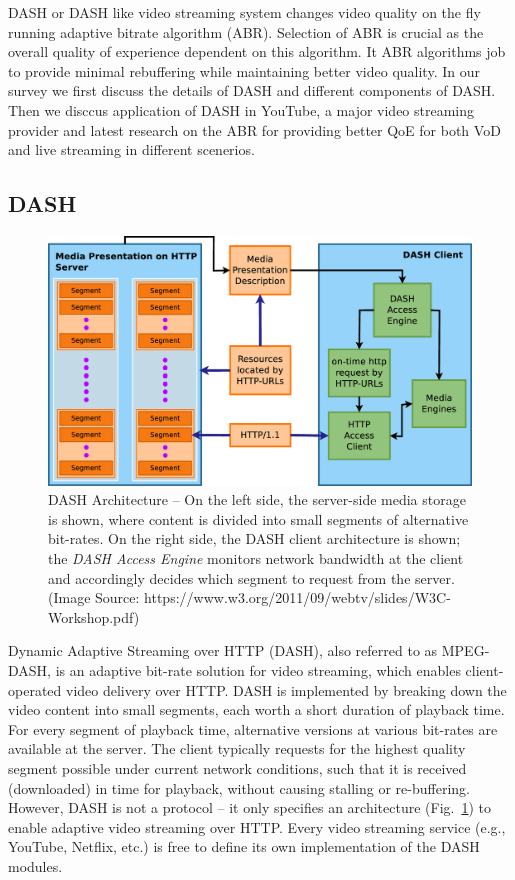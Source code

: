 DASH or DASH like video streaming system changes video quality on the fly running adaptive bitrate algorithm (ABR). Selection of ABR is crucial as the overall quality of experience dependent on this algorithm. It ABR algorithms job to provide minimal rebuffering while maintaining better video quality. In our survey we first discuss the details of DASH and different components of DASH. Then we disccus application of DASH in YouTube, a major video streaming provider and latest research on the ABR for providing better QoE for both VoD and live streaming in different scenerios.

\subsection{DASH}
\begin{figure}[!t]
	\centering
	\includegraphics[scale=0.15]{img/dash-arch}
	\caption{\small{DASH Architecture -- On the left side, the server-side media storage is shown, where content is divided into small segments of alternative bit-rates. On the right side, the DASH client architecture is shown; the {\it DASH Access Engine} monitors network bandwidth at the client and accordingly decides which segment to request from the server. (Image Source: https://www.w3.org/2011/09/webtv/slides/W3C-Workshop.pdf)}}
	\label{fig:dash}
\end{figure}
%
Dynamic Adaptive Streaming over HTTP (DASH), also referred to as MPEG-DASH, is an adaptive bit-rate solution for video streaming, which enables client-operated video delivery over HTTP.
%
DASH is implemented by breaking down the video content into small segments, each worth a short duration of playback time.
%
For every segment of playback time, alternative versions at various bit-rates are available at the server.
%
The client typically requests for the highest quality segment possible under current network conditions, such that it is received (downloaded) in time for playback, without causing stalling or re-buffering. 
%
However, DASH is not a protocol -- it only specifies an architecture (Fig.~\ref{fig:dash}) to enable adaptive video streaming over HTTP.
%
Every video streaming service (e.g., YouTube, Netflix, etc.) is free to define its own implementation of the DASH modules.

